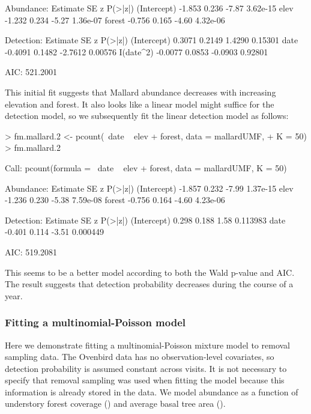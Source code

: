 \documentclass[article,shortnames]{jss}
\begin{document}
{\begin{Schunk}
\begin{Soutput}
Abundance:
            Estimate    SE     z  P(>|z|)
(Intercept)   -1.853 0.236 -7.87 3.62e-15
elev          -1.232 0.234 -5.27 1.36e-07
forest        -0.756 0.165 -4.60 4.32e-06

Detection:
            Estimate     SE       z P(>|z|)
(Intercept)   0.3071 0.2149  1.4290 0.15301
date         -0.4091 0.1482 -2.7612 0.00576
I(date^2)    -0.0077 0.0853 -0.0903 0.92801

AIC: 521.2001 
\end{Soutput}
\end{Schunk}

This initial fit suggests that Mallard abundance decreases with
increasing elevation and forest.  It also looks like a linear model
might suffice for the detection model, so we subsequently fit the
linear detection model as follows:


\begin{Schunk}
\begin{Sinput}
> fm.mallard.2 <- pcount(~date ~ elev + forest, data = mallardUMF, 
+     K = 50)
> fm.mallard.2
\end{Sinput}
\begin{Soutput}
Call:
pcount(formula = ~date ~ elev + forest, data = mallardUMF, K = 50)

Abundance:
            Estimate    SE     z  P(>|z|)
(Intercept)   -1.857 0.232 -7.99 1.37e-15
elev          -1.236 0.230 -5.38 7.59e-08
forest        -0.756 0.164 -4.60 4.23e-06

Detection:
            Estimate    SE     z  P(>|z|)
(Intercept)    0.298 0.188  1.58 0.113983
date          -0.401 0.114 -3.51 0.000449

AIC: 519.2081 
\end{Soutput}
\end{Schunk}

This seems to be a better model according to both the Wald p-value and
AIC.  The result suggests that detection probability decreases during the 
course of a year.



\subsubsection{Fitting a multinomial-Poisson model}

Here we demonstrate fitting a multinomial-Poisson mixture model to removal 
sampling data.  The Ovenbird data has no observation-level covariates, so 
detection probability is assumed constant across visits.  It is not necessary
to specify that removal sampling was used when fitting the model
because this information is already stored in the  data.
We model abundance as a function of understory forest coverage ()
and average basal tree area ().

}
\end{document}
